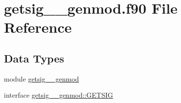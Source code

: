 \hypertarget{getsig____genmod_8f90}{\section{getsig\+\_\+\+\_\+genmod.\+f90 File Reference}
\label{getsig____genmod_8f90}
}
\subsection*{Data Types}
\begin{DoxyCompactItemize}
\item 
module \hyperlink{classgetsig____genmod}{getsig\+\_\+\+\_\+genmod}
\item 
interface \hyperlink{interfacegetsig____genmod_1_1GETSIG}{getsig\+\_\+\+\_\+genmod\+::\+G\+E\+T\+S\+I\+G}
\end{DoxyCompactItemize}
